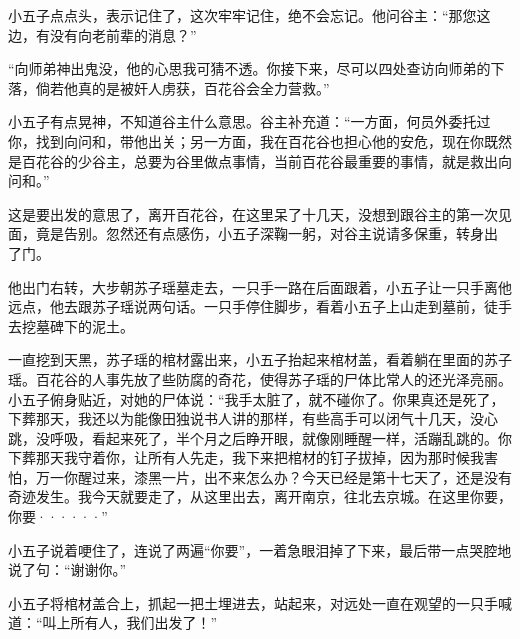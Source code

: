 小五子点点头，表示记住了，这次牢牢记住，绝不会忘记。他问谷主：“那您这边，有没有向老前辈的消息？”

“向师弟神出鬼没，他的心思我可猜不透。你接下来，尽可以四处查访向师弟的下落，倘若他真的是被奸人虏获，百花谷会全力营救。”

小五子有点晃神，不知道谷主什么意思。谷主补充道：“一方面，何员外委托过你，找到向问和，带他出关；另一方面，我在百花谷也担心他的安危，现在你既然是百花谷的少谷主，总要为谷里做点事情，当前百花谷最重要的事情，就是救出向问和。”

这是要出发的意思了，离开百花谷，在这里呆了十几天，没想到跟谷主的第一次见面，竟是告别。忽然还有点感伤，小五子深鞠一躬，对谷主说请多保重，转身出
了门。

他出门右转，大步朝苏子瑶墓走去，一只手一路在后面跟着，小五子让一只手离他远点，他去跟苏子瑶说两句话。一只手停住脚步，看着小五子上山走到墓前，徒手去挖墓碑下的泥土。

一直挖到天黑，苏子瑶的棺材露出来，小五子抬起来棺材盖，看着躺在里面的苏子瑶。百花谷的人事先放了些防腐的奇花，使得苏子瑶的尸体比常人的还光泽亮丽。小五子俯身贴近，对她的尸体说：“我手太脏了，就不碰你了。你果真还是死了，下葬那天，我还以为能像田独说书人讲的那样，有些高手可以闭气十几天，没心跳，没呼吸，看起来死了，半个月之后睁开眼，就像刚睡醒一样，活蹦乱跳的。你下葬那天我守着你，让所有人先走，我下来把棺材的钉子拔掉，因为那时候我害怕，万一你醒过来，漆黑一片，出不来怎么办？今天已经是第十七天了，还是没有奇迹发生。我今天就要走了，从这里出去，离开南京，往北去京城。在这里你要，你要······”

小五子说着哽住了，连说了两遍“你要”，一着急眼泪掉了下来，最后带一点哭腔地说了句：“谢谢你。”

小五子将棺材盖合上，抓起一把土埋进去，站起来，对远处一直在观望的一只手喊道：“叫上所有人，我们出发了！”

\newpage